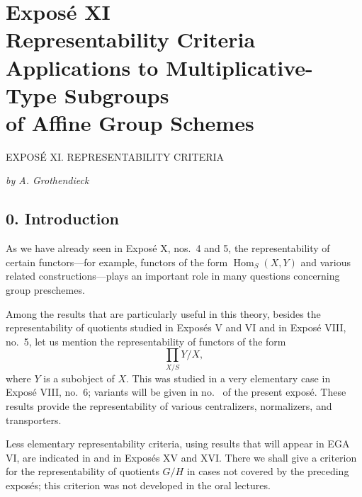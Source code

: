 
\chapter*{Exposé XI\\
Representability Criteria\\
Applications to Multiplicative-Type Subgroups\\
of Affine Group Schemes}
  {EXPOSÉ XI. REPRESENTABILITY CRITERIA}

\begin{center}
  \textit{by A. Grothendieck}
\end{center}

\section*{0. Introduction}

As we have already seen in Exposé X, nos.~4 and 5, the representability
of certain functors---for example, functors of the form
\(\operatorname{Hom}_S(X,Y)\) and various related constructions---plays
an important role in many questions concerning group preschemes.

Among the results that are particularly useful in this theory, besides
the representability of quotients studied in Exposés V and
VI and in Exposé VIII, no.~5, let us mention the
representability of functors of the form
\[
  \prod_{X/S} Y/X ,
\]
where \(Y\) is a subobject of \(X\).  This was studied in a very
elementary case in Exposé VIII, no.~6; variants will be given in no.~
of the present exposé.  These results provide the representability of
various centralizers, normalizers, and transporters.

Less elementary representability criteria, using results that will
appear in EGA VI, are indicated in  and in Exposés XV and XVI.
There we shall give a criterion for the representability of quotients
\(G/H\) in cases not covered by the preceding exposés; this criterion
was not developed in the oral lectures.

